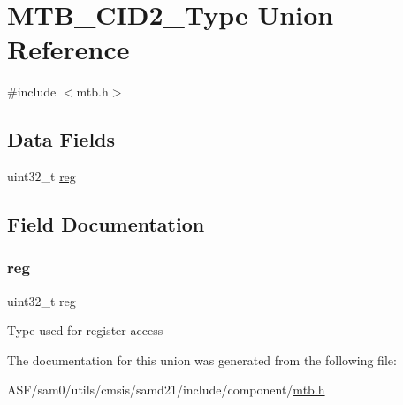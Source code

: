 \hypertarget{union_m_t_b___c_i_d2___type}{}\section{M\+T\+B\+\_\+\+C\+I\+D2\+\_\+\+Type Union Reference}
\label{union_m_t_b___c_i_d2___type}


{\ttfamily \#include $<$mtb.\+h$>$}

\subsection*{Data Fields}
\begin{DoxyCompactItemize}
\item 
uint32\+\_\+t \mbox{\hyperlink{union_m_t_b___c_i_d2___type_a6b91636401516a477989a336376d7b40}{reg}}
\end{DoxyCompactItemize}


\subsection{Field Documentation}
\mbox{\label{union_m_t_b___c_i_d2___type_a6b91636401516a477989a336376d7b40}} 
\subsubsection{\texorpdfstring{reg}{reg}}
{\footnotesize\ttfamily uint32\+\_\+t reg}

Type used for register access 

The documentation for this union was generated from the following file\+:\begin{DoxyCompactItemize}
\item 
A\+S\+F/sam0/utils/cmsis/samd21/include/component/\mbox{\hyperlink{component_2mtb_8h}{mtb.\+h}}\end{DoxyCompactItemize}
